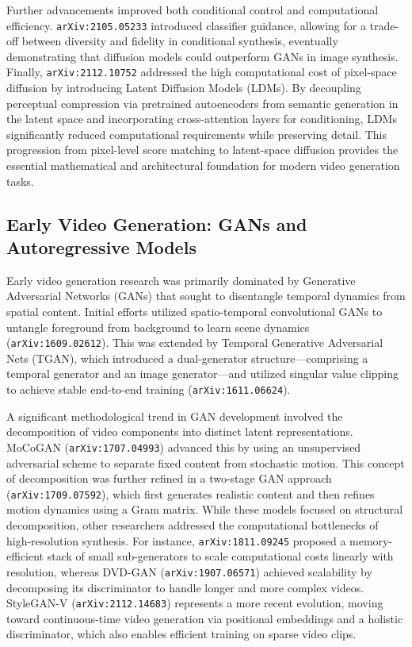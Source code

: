 \documentclass[11pt]{article}
\begin{document}
Further advancements improved both conditional control and computational efficiency. \texttt{arXiv:2105.05233} introduced classifier guidance, allowing for a trade-off between diversity and fidelity in conditional synthesis, eventually demonstrating that diffusion models could outperform GANs in image synthesis. Finally, \texttt{arXiv:2112.10752} addressed the high computational cost of pixel-space diffusion by introducing Latent Diffusion Models (LDMs). By decoupling perceptual compression via pretrained autoencoders from semantic generation in the latent space and incorporating cross-attention layers for conditioning, LDMs significantly reduced computational requirements while preserving detail. This progression from pixel-level score matching to latent-space diffusion provides the essential mathematical and architectural foundation for modern video generation tasks.

\subsection{Early Video Generation: GANs and Autoregressive Models}

Early video generation research was primarily dominated by Generative Adversarial Networks (GANs) that sought to disentangle temporal dynamics from spatial content. Initial efforts utilized spatio-temporal convolutional GANs to untangle foreground from background to learn scene dynamics (\texttt{arXiv:1609.02612}). This was extended by Temporal Generative Adversarial Nets (TGAN), which introduced a dual-generator structure—comprising a temporal generator and an image generator—and utilized singular value clipping to achieve stable end-to-end training (\texttt{arXiv:1611.06624}).

A significant methodological trend in GAN development involved the decomposition of video components into distinct latent representations. MoCoGAN (\texttt{arXiv:1707.04993}) advanced this by using an unsupervised adversarial scheme to separate fixed content from stochastic motion. This concept of decomposition was further refined in a two-stage GAN approach (\texttt{arXiv:1709.07592}), which first generates realistic content and then refines motion dynamics using a Gram matrix. While these models focused on structural decomposition, other researchers addressed the computational bottlenecks of high-resolution synthesis. For instance, \texttt{arXiv:1811.09245} proposed a memory-efficient stack of small sub-generators to scale computational costs linearly with resolution, whereas DVD-GAN (\texttt{arXiv:1907.06571}) achieved scalability by decomposing its discriminator to handle longer and more complex videos. StyleGAN-V (\texttt{arXiv:2112.14683}) represents a more recent evolution, moving toward continuous-time video generation via positional embeddings and a holistic discriminator, which also enables efficient training on sparse video clips.
\end{document}
